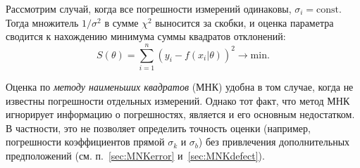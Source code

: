Рассмотрим случай, когда все погрешности измерений одинаковы,
$\sigma_i=\mathrm{const}$. Тогда множитель $1/\sigma^2$ в сумме $\chi^2$
выносится за скобки, и оценка параметра сводится к нахождению минимума суммы
квадратов отклонений:
\begin{equation}
S(\theta) = \sum_{i=1}^n \left(y_i - f(x_i|\theta)\right)^2 \to \mathrm{min}.
\end{equation}


Оценка по \emph{методу наименьших квадратов} (МНК) удобна в том случае,
когда не известны погрешности отдельных измерений. Однако тот  факт, что
метод МНК игнорирует информацию о погрешностях, является и его основным
недостатком. В частности, это не позволяет определить точность оценки
(например, погрешности коэффициентов прямой $\sigma_k$ и
$\sigma_b$) без привлечения дополнительных предположений
(см. п.~\ref{sec:MNKerror} и~\ref{sec:MNKdefect}).



%


